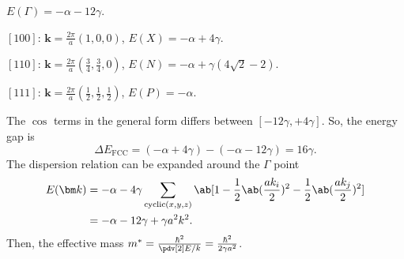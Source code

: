 \begin{solution}[$\text{i} = \text{BCC}$, $\text{ii} = \text{FCC}$]
\begin{enumext}[label = (\alph*\textsubscript{\roman{case}})]
\begin{enumext}
      $E(\Gamma) = -\alpha - 12\gamma$.
      \item $[100]$: $\bm k = \frac{2\pi}{a}(1, 0, 0)$,
      $E(X) = -\alpha + 4\gamma$.
      \item $[110]$: $\bm k = \frac{2\pi}{a}(\frac34, \frac34, 0)$,
      $E(N) = -\alpha + \gamma(4\sqrt2 - 2)$.
      \item $[111]$: $\bm k = \frac{2\pi}a(\frac12, \frac12, \frac12)$,
      $E(P) = -\alpha$.
    \end{enumext}
    \item The $\cos$ terms in the general form differs between
    $[-12\gamma, +4\gamma]$. So, the energy gap is
    \[
      \Delta E_\text{FCC} = (-\alpha + 4\gamma) - (-\alpha - 12\gamma)
    = 16\gamma.
    \]
    The dispersion relation can be expanded around the $\Gamma$ point
    \begin{align*}
      E(\bm k) & = -\alpha - 4\gamma\sum_{\text{cyclic}(x,y,z)}\ab[1
        - \frac12\ab(\frac{ak_i}{2})^2
        - \frac12\ab(\frac{ak_j}{2})^2 ]\\
      & = -\alpha - 12\gamma + \gamma a^2k^2.
    \end{align*}
    Then, the effective mass $m^* = \frac{\hbar^2}{\pdv[2]E/k}
    = \frac{\hbar^2}{2\gamma a^2}$.
  \end{enumext}
\end{solution}